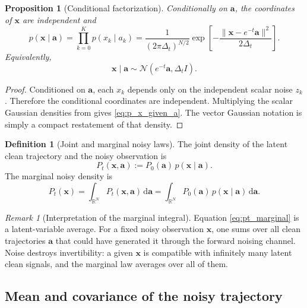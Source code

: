 \documentclass[11pt]{article}
\numberwithin{equation}{section}
\newtheorem{proposition}[theorem]{Proposition}
\theoremstyle{definition}
\newtheorem{definition}[theorem]{Definition}
\theoremstyle{remark}
\newtheorem{remark}[theorem]{Remark}
\newcommand{\R}{\mathbb{R}}
\newcommand{\Id}{I}
\newcommand{\diff}{\,\mathrm{d}}
\newcommand{\Ncal}{\mathcal{N}}
\newcommand{\norm}[1]{\lVert #1\rVert}
\begin{document}
\begin{proposition}[Conditional factorization]\label{prop:conditional_factorization}
Conditionally on $\mathbf a$, the coordinates of $\mathbf x$ are independent and
\begin{equation}\label{eq:p_x_given_a}
p(\mathbf x\mid \mathbf a)
=
\prod_{k=0}^{K}p(x_k\mid a_k)
=
\frac{1}{(2\pi\Delta_t)^{N/2}}
\exp\!\left[-\frac{\norm{\mathbf x-e^{-t}\mathbf a}^2}{2\Delta_t}\right].
\end{equation}
Equivalently,
\[
\mathbf x\mid \mathbf a \sim \Ncal(e^{-t}\mathbf a,\Delta_t\Id).
\]
\end{proposition}

\begin{proof}
Conditioned on $\mathbf a$, each $x_k$ depends only on the independent scalar noise $z_k$. Therefore the conditional coordinates are independent. Multiplying the scalar Gaussian densities from  gives \eqref{eq:p_x_given_a}. The vector Gaussian notation is simply a compact restatement of that density.
\end{proof}

\begin{definition}[Joint and marginal noisy laws]
The joint density of the latent clean trajectory and the noisy observation is
\begin{equation}\label{eq:joint_noisy}
P_t(\mathbf x,\mathbf a):=P_0(\mathbf a)\,p(\mathbf x\mid\mathbf a).
\end{equation}
The marginal noisy density is
\begin{equation}\label{eq:pt_marginal}
P_t(\mathbf x)=\int_{\R^N}P_t(\mathbf x,\mathbf a)\diff \mathbf a
=
\int_{\R^N}P_0(\mathbf a)\,p(\mathbf x\mid \mathbf a)\diff\mathbf a.
\end{equation}
\end{definition}

\begin{remark}[Interpretation of the marginal integral]
Equation \eqref{eq:pt_marginal} is a latent-variable average. For a fixed noisy observation $\mathbf x$, one sums over all clean trajectories $\mathbf a$ that could have generated it through the forward noising channel. Noise destroys invertibility: a given $\mathbf x$ is compatible with infinitely many latent clean signals, and the marginal law averages over all of them.
\end{remark}

\subsection{Mean and covariance of the noisy trajectory}
\end{document}
